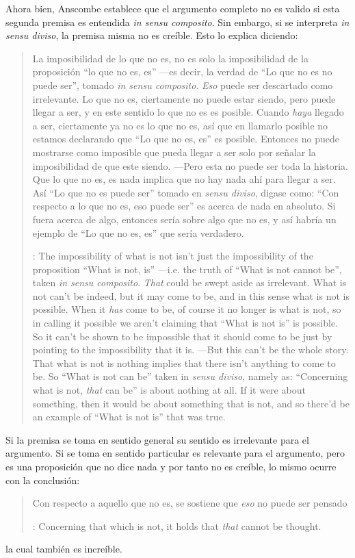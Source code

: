 Ahora bien, Anscombe establece que el argumento completo no es valido si esta
segunda premisa es entendida \emph{in sensu composito}. Sin embargo, si se
interpreta \emph{in sensu diviso}, la premisa misma no es creíble. Esto lo
explica diciendo: \blockquote[{\cite[vii]{anscombe1981parmenides}}: The
impossibility of what is not isn't just the impossibility of the proposition
``What is not, is'' ---i.e. the truth of ``What is not cannot be'', taken
\emph{in sensu composito}. \emph{That} could be swept aside as irrelevant. What
is not can't be indeed, but it may come to be, and in this sense what is not is
possible. When it \emph{has} come to be, of course it no longer is what is not,
so in calling it possible we aren't claiming that ``What is not is'' is
possible. So it can't be shown to be impossible that it should come to be just
by pointing to the impossibility that it is. ---But this can't be the whole
story. That what is not is nothing implies that there isn't anything to come to
be. So ``What is not can be'' taken in \emph{sensu diviso}, namely as:
``Concerning what is not, \emph{that} can be'' is about nothing at all. If it
were about something, then it would be about something that is not, and so
there'd be an example of ``What is not is'' that was true.]{La imposibilidad de
  lo que no es, no es solo la imposibilidad de la proposición ``lo que no es,
  es'' ---es decir, la verdad de ``Lo que no es no puede ser'', tomado \emph{in
    sensu composito}. \emph{Eso} puede ser descartado como irrelevante. Lo que
  no es, ciertamente no puede estar siendo, pero puede llegar a ser, y en este
  sentido lo que no es es posible. Cuando \emph{haya} llegado a ser, ciertamente
  ya no es lo que no es, así que en llamarlo posible no estamos declarando que
  ``Lo que no es, es'' es posible. Entonces no puede mostrarse como imposible
  que pueda llegar a ser solo por señalar la imposibilidad de que este siendo.
  ---Pero esta no puede ser toda la historia. Que lo que no es, es nada implica
  que no hay nada ahí para llegar a ser. Así ``Lo que no es puede ser'' tomado
  en \emph{sensu diviso}, digase como: ``Con respecto a lo que no es, eso puede
  ser'' es acerca de nada en absoluto. Si fuera acerca de algo, entonces sería
  sobre algo que no es, y así habría un ejemplo de ``Lo que no es, es'' que
  sería verdadero.} Si la premisa se toma en sentido general su sentido es
irrelevante para el argumento. Si se toma en sentido particular es relevante
para el argumento, pero es una proposición que no dice nada y por tanto no es
creíble, lo mismo ocurre con la conclusión:
\blockquote[{\cite[3]{anscombe1981parmenides:pmc}}: Concerning that which is
not, it holds that \emph{that} cannot be thought.]{Con respecto a aquello que no
  es, se sostiene que \emph{eso} no puede ser pensado} la cual también es
increíble.

